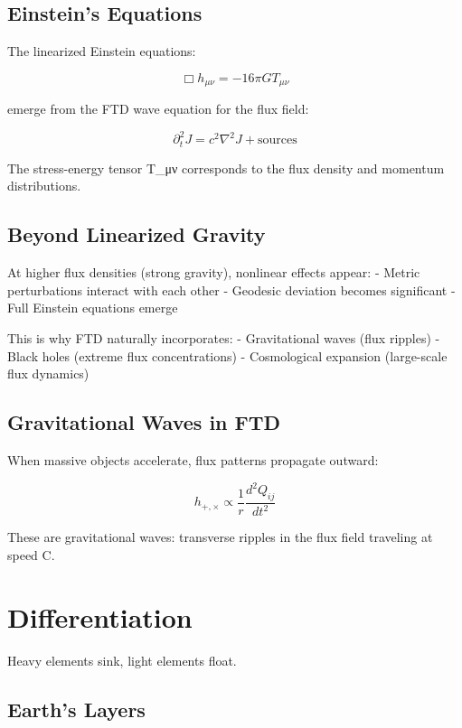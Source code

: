 \documentclass[
  11pt,
  letterpaper,
  twoside,
  openright]{book}
\begin{document}
\subsection{Einstein's Equations}\label{einsteins-equations}

The linearized Einstein equations:

\[\Box h_{\mu\nu} = -16\pi G T_{\mu\nu}\]

emerge from the FTD wave equation for the flux field:

\[\partial_t^2 J = c^2 \nabla^2 J + \text{sources}\]

The stress-energy tensor T\_μν corresponds to the flux density and
momentum distributions.

\subsection{Beyond Linearized Gravity}\label{beyond-linearized-gravity}

At higher flux densities (strong gravity), nonlinear effects appear: -
Metric perturbations interact with each other - Geodesic deviation
becomes significant - Full Einstein equations emerge

This is why FTD naturally incorporates: - Gravitational waves (flux
ripples) - Black holes (extreme flux concentrations) - Cosmological
expansion (large-scale flux dynamics)

\subsection{Gravitational Waves in
FTD}\label{gravitational-waves-in-ftd}

When massive objects accelerate, flux patterns propagate outward:

\[h_{+,\times} \propto \frac{1}{r}\frac{d^2Q_{ij}}{dt^2}\]

These are gravitational waves: transverse ripples in the flux field
traveling at speed C.

\section{Differentiation}\label{differentiation}

Heavy elements sink, light elements float.

\subsection{Earth's Layers}\label{earths-layers}
\end{document}
